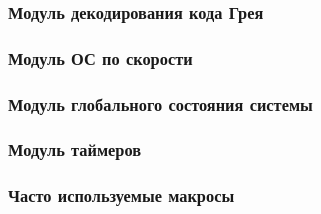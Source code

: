\newpage
\subsubsection{Модуль декодирования кода Грея}
\label{module_sensors_encoder_gray_code_decoder}




\newpage
\subsubsection{Модуль ОС по скорости}
\label{module_speed_feedback}



\newpage
\subsubsection{Модуль глобального состояния системы}
\label{module_state}



\newpage
\subsubsection{Модуль таймеров}
\label{module_timers}



\newpage
\subsubsection{Часто используемые макросы}
\label{module_macros}


